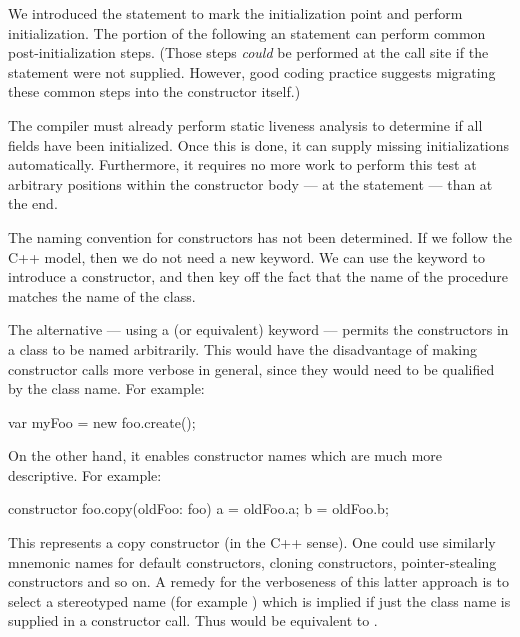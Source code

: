 \begin{rationale}
We introduced the  statement to mark the initialization point and
perform initialization.  The portion of the 
following an  statement can perform common post-initialization steps.
(Those steps \emph{could} be performed at the call site if the 
statement were not supplied.  However, good coding practice suggests migrating
these common steps into the constructor itself.)

The compiler must already perform static liveness analysis to determine if all
fields have been initialized.  Once this is done, it can supply missing
initializations automatically.  Furthermore, it requires no more work to perform
this test at arbitrary positions within the constructor body --- at
the  statement --- than at the end.
\end{rationale}

\begin{openissue}
The naming convention for constructors has not been determined.  If we follow
the C++ model, then we do not need a new keyword.  We can use the 
keyword to introduce a constructor, and then key off the fact that the name of
the procedure matches the name of the class.

The alternative --- using a  (or equivalent) keyword ---
permits the constructors in a class to be named arbitrarily.  This would have the
disadvantage of making constructor calls more verbose in general, since they
would need to be qualified by the class name.  For example:
\begin{chapel}
var myFoo = new foo.create();
\end{chapel}
On the other hand, it enables constructor names which are much more
descriptive.  For example:
\begin{chapel}
constructor foo.copy(oldFoo: foo) 
{ a = oldFoo.a; b = oldFoo.b; }
\end{chapel}
This represents a copy constructor (in the C++ sense).  One could use similarly
mnemonic names for default constructors, cloning constructors, pointer-stealing constructors and so
on.  
A remedy for the verboseness of this latter approach is to select a
stereotyped name (for example ) which is implied if just
the class name is supplied in a constructor call.  Thus  would be equivalent to  .
\end{openissue}

